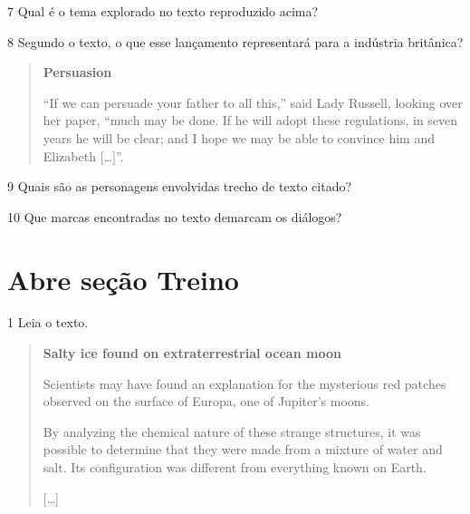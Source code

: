 \num{7} Qual é o tema explorado no texto reproduzido acima?



\num{8} Segundo o texto, o que esse lançamento representará para a indústria britânica?




\begin{quote}
\textbf{Persuasion}

``If we can persuade your father to all this,'' said Lady Russell,
looking over her paper, ``much may be done. If he will adopt these
regulations, in seven years he will be clear; and I hope we may be able
to convince him and Elizabeth {[}\ldots{}{]}''.

\end{quote}

\num{9} Quais são as personagens envolvidas trecho de texto citado?



\num{10} Que marcas encontradas no texto demarcam os diálogos?



\section{Abre seção Treino}

\num{1} Leia o texto.

\begin{quote}
\textbf{Salty ice found on extraterrestrial ocean moon}

Scientists may have found an explanation for the mysterious red patches observed on the surface of Europa, one of Jupiter’s moons.

By analyzing the chemical nature of these strange structures, it was possible to determine that they were made from a mixture of water and salt. Its configuration was different from everything known on Earth.

{[}\ldots{}{]}

\end{quote}


